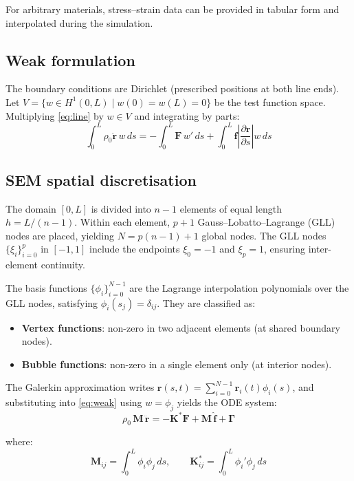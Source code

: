 \documentclass[11pt]{article}
\newcommand{\pa}{\partial}
\begin{document}
For arbitrary materials, stress--strain data can be provided in tabular form and interpolated during the simulation.

\subsection{Weak formulation}

The boundary conditions are Dirichlet (prescribed positions at both line ends). Let $V = \{w\in H^1(0,L)\mid w(0)=w(L)=0\}$ be the test function space. Multiplying \eqref{eq:line} by $w\in V$ and integrating by parts:
\begin{equation}
\int_0^L\rho_0\ddot{\mathbf{r}}\,w\,ds = -\int_0^L\mathbf{F}\,w'\,ds + \int_0^L\mathbf{f}\left|\frac{\pa\mathbf{r}}{\pa s}\right|w\,ds
\label{eq:weak}
\end{equation}

\subsection{SEM spatial discretisation}

The domain $[0,L]$ is divided into $n-1$ elements of equal length $h=L/(n-1)$. Within each element, $p+1$ Gauss--Lobatto--Lagrange (GLL) nodes are placed, yielding $N = p(n-1)+1$ global nodes. The GLL nodes $\{\xi_i\}_{i=0}^p$ in $[-1,1]$ include the endpoints $\xi_0=-1$ and $\xi_p=1$, ensuring inter-element continuity.

The basis functions $\{\phi_i\}_{i=0}^{N-1}$ are the Lagrange interpolation polynomials over the GLL nodes, satisfying $\phi_i(s_j) = \delta_{ij}$. They are classified as:
\begin{itemize}
    \item \textbf{Vertex functions}: non-zero in two adjacent elements (at shared boundary nodes).
    \item \textbf{Bubble functions}: non-zero in a single element only (at interior nodes).
\end{itemize}

The Galerkin approximation writes $\mathbf{r}(s,t) = \sum_{i=0}^{N-1}\mathbf{r}_i(t)\phi_i(s)$, and substituting into \eqref{eq:weak} using $w=\phi_j$ yields the ODE system:
\begin{equation}
\rho_0\,\mathbf{M}\,\ddot{\mathbf{r}} = -\mathbf{K}^*\mathbf{F} + \mathbf{M}\,\hat{\mathbf{f}} + \boldsymbol{\Gamma}
\label{eq:line-ode}
\end{equation}

where:
\begin{equation}
\mathbf{M}_{ij} = \int_0^L\phi_i\phi_j\,ds, \qquad \mathbf{K}^*_{ij} = \int_0^L\phi_i'\phi_j\,ds
\end{equation}
\end{document}
